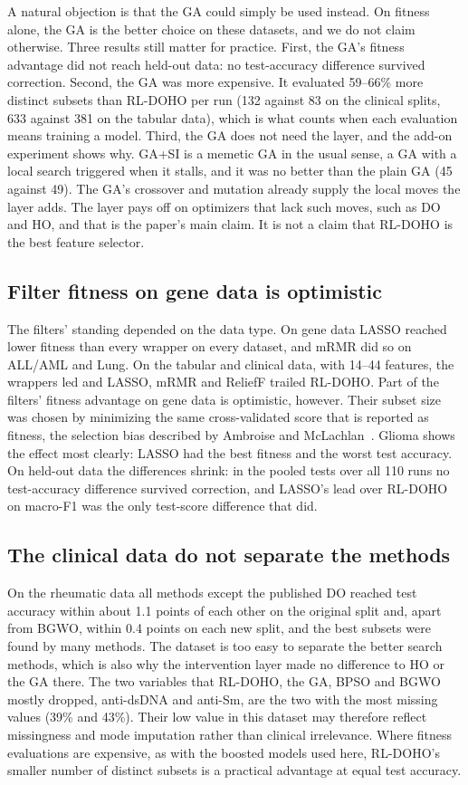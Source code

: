 \documentclass[journal]{IEEEtran}
\begin{document}
A natural objection is that the GA could simply be used instead. On fitness alone, the GA is the better choice on these datasets, and we do not claim otherwise. Three results still matter for practice. First, the GA's fitness advantage did not reach held-out data: no test-accuracy difference survived correction. Second, the GA was more expensive. It evaluated 59--66\% more distinct subsets than RL-DOHO per run (132 against 83 on the clinical splits, 633 against 381 on the tabular data), which is what counts when each evaluation means training a model. Third, the GA does not need the layer, and the add-on experiment shows why. GA+SI is a memetic GA in the usual sense, a GA with a local search triggered when it stalls, and it was no better than the plain GA (45 against 49). The GA's crossover and mutation already supply the local moves the layer adds. The layer pays off on optimizers that lack such moves, such as DO and HO, and that is the paper's main claim. It is not a claim that RL-DOHO is the best feature selector.

\subsection{Filter fitness on gene data is optimistic}
The filters' standing depended on the data type. On gene data LASSO reached lower fitness than every wrapper on every dataset, and mRMR did so on ALL/AML and Lung. On the tabular and clinical data, with 14--44 features, the wrappers led and LASSO, mRMR and ReliefF trailed RL-DOHO. Part of the filters' fitness advantage on gene data is optimistic, however. Their subset size was chosen by minimizing the same cross-validated score that is reported as fitness, the selection bias described by Ambroise and McLachlan~\cite{ambroise2002}. Glioma shows the effect most clearly: LASSO had the best fitness and the worst test accuracy. On held-out data the differences shrink: in the pooled tests over all 110 runs no test-accuracy difference survived correction, and LASSO's lead over RL-DOHO on macro-F1 was the only test-score difference that did.

\subsection{The clinical data do not separate the methods}
On the rheumatic data all methods except the published DO reached test accuracy within about 1.1 points of each other on the original split and, apart from BGWO, within 0.4 points on each new split, and the best subsets were found by many methods. The dataset is too easy to separate the better search methods, which is also why the intervention layer made no difference to HO or the GA there. The two variables that RL-DOHO, the GA, BPSO and BGWO mostly dropped, anti-dsDNA and anti-Sm, are the two with the most missing values (39\% and 43\%). Their low value in this dataset may therefore reflect missingness and mode imputation rather than clinical irrelevance. Where fitness evaluations are expensive, as with the boosted models used here, RL-DOHO's smaller number of distinct subsets is a practical advantage at equal test accuracy.
\end{document}
